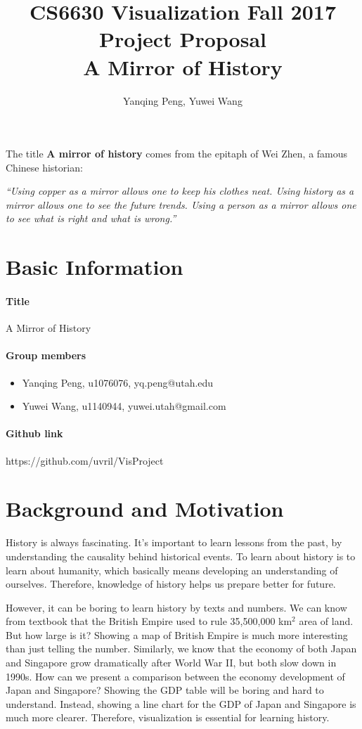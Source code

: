 \documentclass[12pt, fullpage,letterpaper]{article}
\title{CS6630 Visualization Fall 2017 Project Proposal\\ A Mirror of History}
\author{Yanqing Peng, Yuwei Wang}
\begin{document}
\maketitle

The title \textbf{A mirror of history} comes from the epitaph of Wei Zhen,
a famous Chinese historian:

\emph{``Using copper as a mirror allows one to keep his clothes neat. Using
history as a mirror allows one to see the future trends. Using a person as a
mirror allows one to see what is right and what is wrong.''}

\section{Basic Information}
\paragraph{Title} A Mirror of History
\paragraph{Group members}
\begin{itemize}
    \item Yanqing Peng, u1076076, yq.peng@utah.edu
    \item Yuwei Wang, u1140944, yuwei.utah@gmail.com
\end{itemize}
\paragraph{Github link} https://github.com/uvril/VisProject

\section{Background and Motivation}

History is always fascinating.  It's important to learn lessons from the past,
by understanding the causality behind historical events.  To learn about
history is to learn about humanity, which basically means developing an
understanding of ourselves.  Therefore, knowledge of history helps us prepare
better for future.

However, it can be boring to learn history by texts and numbers. We can know
from textbook that the British Empire used to rule 35,500,000 km$^2$ area of
land. But how large is it?  Showing a map of British Empire is much more
interesting than just telling the number.  Similarly, we know that the economy
of both Japan and Singapore grow dramatically after World War II, but both slow
down in 1990s.  How can we present a comparison between the economy development
of Japan and Singapore?  Showing the GDP table will be boring and hard to
understand.  Instead, showing a line chart for the GDP of Japan and Singapore
is much more clearer. Therefore, visualization is essential for learning history.
\end{document}
